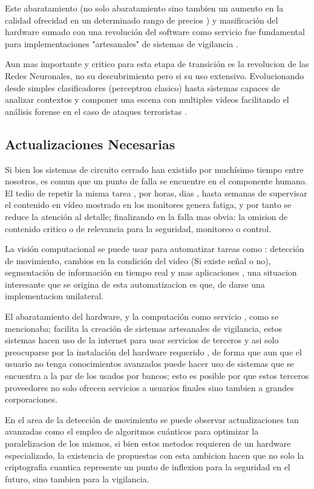 \documentclass[a4paper]{IEEEtranUNT}
\begin{document}
Este abaratamiento (no solo abaratamiento sino tambien un aumento en la calidad ofrecidad en un determinado rango de precios \citep{Chaki2010}) y masificación del hardware sumado con una revolución del software como servicio fue fundamental para implementaciones "artesanales" de sistemas de vigilancia \citep{s2020iot}.

Aun mas importante y critico para esta etapa de transición es la revolucion de las Redes Neuronales, no su descubrimiento pero si su uso extensivo. Evolucionando desde simples clasificadores (perceptron clasico) hasta sistemas capaces de analizar contextos y componer una escena con multiples videos facilitando el análisis forense en el caso de ataques terroristas \citep{alex2020multimodal}.

\subsection{Actualizaciones Necesarias}

Si bien los sistemas de circuito cerrado han existido por muchísimo tiempo entre nosotros, es comun que un punto de falla se encuentre en el componente humano. El tedio de repetir la misma tarea , por horas, dias , hasta semanas de supervisar el contenido en vídeo mostrado en los monitores genera fatiga, y por tanto se reduce la atención al detalle; finalizando en la falla mas obvia: la omision de contenido critico o de relevancia para la seguridad, monitoreo o control.


La visión computacional se puede usar para automatizar tareas como : detección de movimiento, cambios en la condición del video (Si existe señal o no), segmentación de información en tiempo real y mas aplicaciones \citep{Potgieter2012}, una situacion interesante que se origina de esta automatizacion es que, de darse una implementacion unilateral.

El abaratamiento del hardware, y la computación como servicio , como se mencionaba; facilita la creación de sistemas artesanales de vigilancia, estos sistemas hacen uso de la internet para usar servicios de terceros y asi solo preocuparse por la instalación del hardware requerido \citep{Othman2017}, de forma que aun que el usuario no tenga conocimientos avanzados puede hacer uso de sistemas que se encuentra a la par de los usados por bancos; esto es posible por que estos terceros proveedores no solo ofrecen servicios a usuarios finales sino tambien a grandes corporaciones.

En el area de la detección de movimiento se puede observar actualizaciones tan avanzadas como el empleo de algoritmos cuánticos \citep{Yu_2019} para optimizar la paralelizacion de los mismos, si bien estos metodos requieren de un hardware especializado, la existencia de propuestas con esta ambicion hacen que no solo la criptografia cuantica represente un punto de inflexion para la seguridad en el futuro, sino tambien para la vigilancia.
\end{document}
